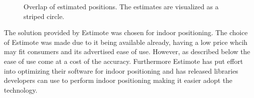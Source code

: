\begin{figure}[!htb]
\begin{minipage}[t]{0.45\textwidth}
        \caption{Overlap of estimated positions. The estimates are visualized as a striped circle.}
        \label{fig:indoor-positioning:overlap}
    \end{minipage}
\end{figure}

The solution provided by Estimote was chosen for indoor positioning. The choice of Estimote was made due to it being available already, having a low price whcih may fit consumers and its advertised ease of use. However, as described below the ease of use come at a cost of the accuracy.
Furthermore Estimote has put effort into optimizing their software for indoor positioning and has released libraries developers can use to perform indoor positioning making it easier adopt the technology.



